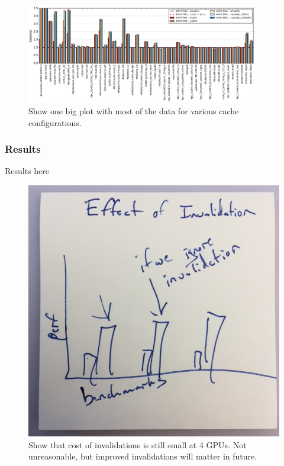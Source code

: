 \begin{figure}[tp]
    \centering
    \includegraphics[width=0.9\textwidth]{figures/caching.jpg}
    \caption{Show one big plot with most of the data for various cache 
configurations.}
    \label{fig:caching}
\end{figure}


\subsubsection{Results}
Results here

\begin{figure}[tp]
    \centering
    \includegraphics[width=0.9\columnwidth]{figures/invalidations.jpg}
    \caption{Show that cost of invalidations is still small at 4 GPUs.  Not 
unreasonable, but improved invalidations will matter in future.}
    \label{fig:invalidations}
\end{figure}

